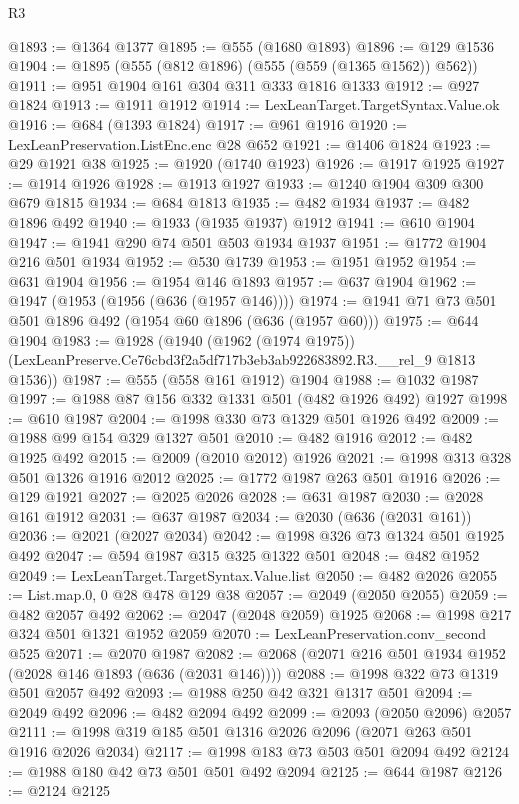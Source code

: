 \begin{lexlean}{R3}
\begin{coremodule}
@1893 := @1364 @1377
@1895 := @555 (@1680 @1893)
@1896 := @129 @1536
@1904 := @1895 (@555 (@812 @1896) (@555 (@559 (@1365 @1562)) @562))
@1911 := @951 @1904 @161 @304 @311 @333 @1816 @1333
@1912 := @927 @1824
@1913 := @1911 @1912
@1914 := LexLeanTarget.TargetSyntax.Value.ok
@1916 := @684 (@1393 @1824)
@1917 := @961 @1916
@1920 := LexLeanPreservation.ListEnc.enc @28 @652
@1921 := @1406 @1824
@1923 := @29 @1921 @38
@1925 := @1920 (@1740 @1923)
@1926 := @1917 @1925
@1927 := @1914 @1926
@1928 := @1913 @1927
@1933 := @1240 @1904 @309 @300 @679 @1815
@1934 := @684 @1813
@1935 := @482 @1934
@1937 := @482 @1896 @492
@1940 := @1933 (@1935 @1937) @1912
@1941 := @610 @1904
@1947 := @1941 @290 @74 @501 @503 @1934 @1937
@1951 := @1772 @1904 @216 @501 @1934
@1952 := @530 @1739
@1953 := @1951 @1952
@1954 := @631 @1904
@1956 := @1954 @146 @1893
@1957 := @637 @1904
@1962 := @1947 (@1953 (@1956 (@636 (@1957 @146))))
@1974 := @1941 @71 @73 @501 @501 @1896 @492 (@1954 @60 @1896 (@636 (@1957 @60)))
@1975 := @644 @1904
@1983 := @1928
    (@1940
      (@1962 (@1974 @1975))
      (LexLeanPreserve.Ce76cbd3f2a5df717b3eb3ab922683892.R3.__rel_9 @1813 @1536))
@1987 := @555 (@558 @161 @1912) @1904
@1988 := @1032 @1987
@1997 := @1988 @87 @156 @332 @1331 @501 (@482 @1926 @492) @1927
@1998 := @610 @1987
@2004 := @1998 @330 @73 @1329 @501 @1926 @492
@2009 := @1988 @99 @154 @329 @1327 @501
@2010 := @482 @1916
@2012 := @482 @1925 @492
@2015 := @2009 (@2010 @2012) @1926
@2021 := @1998 @313 @328 @501 @1326 @1916 @2012
@2025 := @1772 @1987 @263 @501 @1916
@2026 := @129 @1921
@2027 := @2025 @2026
@2028 := @631 @1987
@2030 := @2028 @161 @1912
@2031 := @637 @1987
@2034 := @2030 (@636 (@2031 @161))
@2036 := @2021 (@2027 @2034)
@2042 := @1998 @326 @73 @1324 @501 @1925 @492
@2047 := @594 @1987 @315 @325 @1322 @501
@2048 := @482 @1952
@2049 := LexLeanTarget.TargetSyntax.Value.list
@2050 := @482 @2026
@2055 := List.map.{0, 0} @28 @478 @129 @38
@2057 := @2049 (@2050 @2055)
@2059 := @482 @2057 @492
@2062 := @2047 (@2048 @2059) @1925
@2068 := @1998 @217 @324 @501 @1321 @1952 @2059
@2070 := LexLeanPreservation.conv_second @525
@2071 := @2070 @1987
@2082 := @2068 (@2071 @216 @501 @1934 @1952 (@2028 @146 @1893 (@636 (@2031 @146))))
@2088 := @1998 @322 @73 @1319 @501 @2057 @492
@2093 := @1988 @250 @42 @321 @1317 @501
@2094 := @2049 @492
@2096 := @482 @2094 @492
@2099 := @2093 (@2050 @2096) @2057
@2111 := @1998 @319 @185 @501 @1316 @2026 @2096 (@2071 @263 @501 @1916 @2026 @2034)
@2117 := @1998 @183 @73 @503 @501 @2094 @492
@2124 := @1988 @180 @42 @73 @501 @501 @492 @2094
@2125 := @644 @1987
@2126 := @2124 @2125

\end{coremodule}
\end{lexlean}
